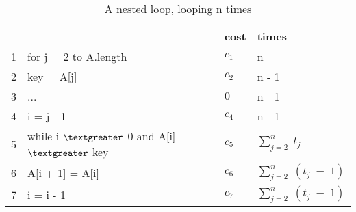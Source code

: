 \begin{center}
	\begin{table}[h]
		\centering
		\begin{tabular}{|l|l|l|l|}
			 \hline
			& & cost & times                      \\ \hline
			1 & for j = 2 to A.length & $c_1$ & n \\ \hline
			2 & key = A[j] & $c_2$ & n - 1 \\ \hline
			3 & ... & $0$ & n - 1 \\ \hline
			4 & i = j - 1                    & $c_4$ & n - 1 \\ \hline
			5 & while i $\textgreater$ 0 and A[i] $\textgreater$ key & $c_5$ &  $\sum_{j=2}^{n}\;t_j$ \\ \hline
			6 & A[i + 1] = A[i] & $c_6$ &  $\sum_{j=2}^{n}\;(t_j\;-\;1)$ \\ \hline
			7 & i = i - 1 & $c_7$ &  $\sum_{j=2}^{n}\;(t_j\;-\;1)$ \\ \hline
		\end{tabular}
		\caption{A nested loop, looping n times}
		\label{tab:insertionCode}
	\end{table}
\end{center}